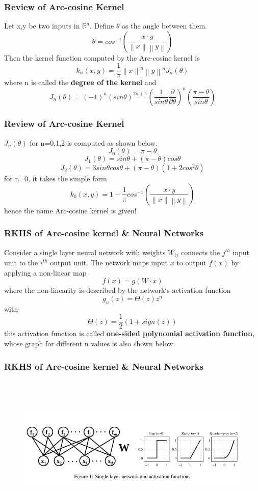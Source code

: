\documentclass{beamer}
\begin{document}
\begin{frame}
\frametitle{Review of Arc-cosine Kernel}
Let x,y be two inputs in $\mathbb{R}^d$. Define $\theta$ as the angle between them.
\[ \theta = cos^{-1}\left ( \frac{x\cdot y}{\left \| x \right \| \left \| y \right \|} \right ) \]
Then the kernel function computed by the Arc-cosine kernel is
\[ k_n(x,y) = \frac{1}{\pi}\left \| x \right \|^n \left \| y \right \|^n J_n(\theta) \]
where n is called the \textbf{degree of the kernel} and
\[ J_n(\theta) = (-1)^n(sin\theta)^{2n+1} \left ( \frac{1}{sin\theta} \frac{\partial}{\partial \theta} \right )^n \left ( \frac{\pi-\theta}{sin\theta} \right ) \]

\end{frame}

\begin{frame}
\frametitle{Review of Arc-cosine Kernel}
$J_n(\theta)$ for n=0,1,2 is computed as shown below.
\[ J_0(\theta) = \pi-\theta \]
\[ J_1(\theta) = sin\theta + (\pi-\theta)cos\theta \]
\[ J_2(\theta) = 3sin\theta cos\theta + (\pi-\theta)(1+2cos^2\theta) \]
for n=0, it takes the simple form
\[k_0(x,y) =  1- \frac{1}{\pi}cos^{-1}\left ( \frac{x\cdot y}{\left \| x \right \| \left \| y \right \|} \right )  \]
hence the name Arc-cosine kernel is given!
\end{frame}

\begin{frame}
\frametitle{RKHS of Arc-cosine kernel \& Neural Networks}
Consider a single layer neural network with weights $W_{ij}$ connects the $j^{th}$ input unit to the $i^{th}$ output unit. The network maps input $x$ to output $f(x)$ by applying a non-linear map 
\[ f(x) = g(W \cdot x) \]
where the non-linearity is described by the network`s activation function
\[g_n(z) = \Theta(z)z^n \]
with 
\[ \Theta(z) = \frac{1}{2}(1+sign(z)) \]
this activation function is called \textbf{one-sided polynomial activation function}, whose graph for different n values is also shown below.
\end{frame}

\begin{frame}
\frametitle{RKHS of Arc-cosine kernel \& Neural Networks}
\begin{figure}
\includegraphics[width=1.0\linewidth, height=7cm]{figures/neuralnet}
\end{figure}
\end{frame}
\end{document}
